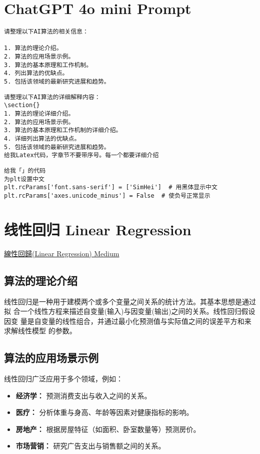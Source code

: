 \section*{ChatGPT 4o mini Prompt}

\begin{lstlisting}
请整理以下AI算法的相关信息：

1. 算法的理论介绍。
2. 算法的应用场景示例。
3. 算法的基本原理和工作机制。
4. 列出算法的优缺点。
5. 包括该领域的最新研究进展和趋势。
\end{lstlisting}

\begin{lstlisting}
请整理以下AI算法的详细解释内容：
\section{}
1. 算法的理论详细介绍。
2. 算法的应用场景示例。
3. 算法的基本原理和工作机制的详细介绍。
4. 详细列出算法的优缺点。
5. 包括该领域的最新研究进展和趋势。
给我Latex代码，字章节不要带序号。每一个都要详细介绍
\end{lstlisting}

\begin{lstlisting}
给我「」的代码
为plt设置中文
plt.rcParams['font.sans-serif'] = ['SimHei']  # 用黑体显示中文
plt.rcParams['axes.unicode_minus'] = False  # 使负号正常显示
\end{lstlisting}

\section{线性回归 Linear Regression}
\href{https://chih-sheng-huang821.medium.com/%E7%B7%9A%E6%80%A7%E5%9B%9E%E6%AD%B8-linear-regression-3a271a7453e}{線性回歸(Linear Regression) Medium}

\subsection*{算法的理论介绍}
线性回归是一种用于建模两个或多个变量之间关系的统计方法。其基本思想是通过拟
合一个线性方程来描述自变量(输入)与因变量(输出)之间的关系。线性回归假设因变
量是自变量的线性组合，并通过最小化预测值与实际值之间的误差平方和来求解线性模型
的参数。

\subsection*{算法的应用场景示例}
线性回归广泛应用于多个领域，例如：
\begin{itemize}
    \item \textbf{经济学：} 预测消费支出与收入之间的关系。
    \item \textbf{医疗：} 分析体重与身高、年龄等因素对健康指标的影响。
    \item \textbf{房地产：} 根据房屋特征（如面积、卧室数量等）预测房价。
    \item \textbf{市场营销：} 研究广告支出与销售额之间的关系。
\end{itemize}

